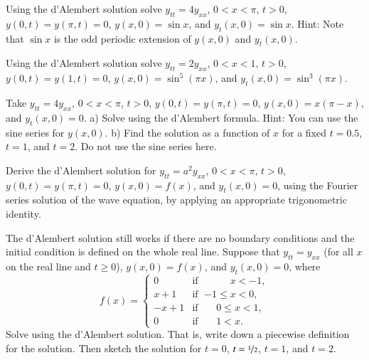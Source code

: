 \begin{exercise}
Using the d'Alembert solution solve $y_{tt} = 4y_{xx}$, $0 < x < \pi$, $t >
0$,
$y(0,t) = y(\pi, t) = 0$, $y(x,0) = \sin x$, and
$y_t(x,0) = \sin x$.  Hint: Note that $\sin x$ is the odd periodic extension of
$y(x,0)$ and $y_t(x,0)$.
\end{exercise}

\begin{exercise}
Using the d'Alembert solution solve $y_{tt} = 2y_{xx}$, $0 < x < 1$, $t > 0$,
$y(0,t) = y(1, t) = 0$, $y(x,0) = \sin^5 (\pi x)$, and
$y_t(x,0) = \sin^3 (\pi x)$.
\end{exercise}

\begin{exercise}
Take
$y_{tt} = 4y_{xx}$, $0 < x < \pi$, $t > 0$,
$y(0,t) = y(\pi, t) = 0$, $y(x,0) = x(\pi-x)$, and
$y_t(x,0) = 0$.
a) Solve using the d'Alembert formula.  Hint: You can use the sine series
for $y(x,0)$.
b) Find the solution as a function of $x$ for a fixed $t=0.5$, $t=1$, and
$t=2$.  Do not use the sine series here.
\end{exercise}

\begin{exercise}
Derive the d'Alembert solution for $y_{tt} = a^2 y_{xx}$, $0 < x < \pi$, $t >
0$,
$y(0,t) = y(\pi, t) = 0$, $y(x,0) = f(x)$, and
$y_t(x,0) = 0$, using the Fourier series solution of the wave equation,
by applying an appropriate trigonometric identity.
\end{exercise}

\begin{exercise}
The d'Alembert solution still works if there are no boundary conditions and
the initial condition is defined on the whole real line.  Suppose that
$y_{tt} = y_{xx}$ (for all $x$ on the real line and $t \geq 0$),
$y(x,0) = f(x)$, and
$y_t(x,0) = 0$, where
\begin{equation*}
f(x) =
\begin{cases}
0 & \text{if } \; \phantom{{-1} \leq {} }x < -1, \\
x+1 & \text{if } \; {-1} \leq x < 0, \\
-x+1 & \text{if } \; \phantom{-}0 \leq x < 1, \\
0 & \text{if } \; \phantom{-}1 < x .
\end{cases}
\end{equation*}
Solve using the d'Alembert solution. That is, write down a piecewise
definition for the solution.  Then sketch the solution for $t=0$,
$t=\nicefrac{1}{2}$, $t=1$, and $t=2$.
\end{exercise}

